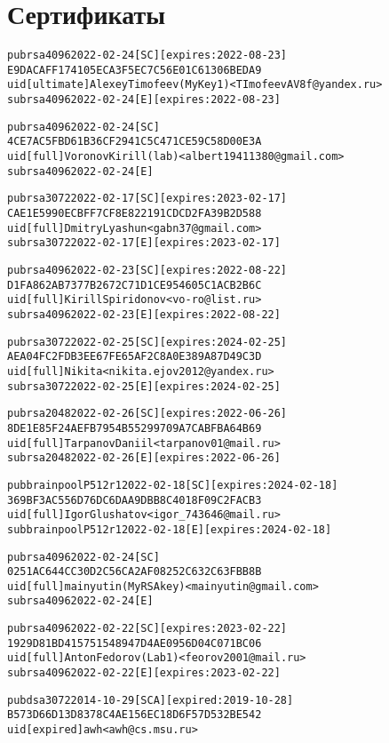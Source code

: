 \section{Сертификаты}
\begin{alltt}

pub   rsa4096 2022-02-24 [SC] [expires: 2022-08-23]
      E9DACAFF174105ECA3F5EC7C56E01C61306BEDA9
uid           [ultimate] Alexey Timofeev (My Key1) <TImofeevAV8f@yandex.ru>
sub   rsa4096 2022-02-24 [E] [expires: 2022-08-23]

pub   rsa4096 2022-02-24 [SC]
      4CE7AC5FBD61B36CF2941C5C471CE59C58D00E3A
uid           [  full  ] Voronov Kirill (lab) <albert19411380@gmail.com>
sub   rsa4096 2022-02-24 [E]

pub   rsa3072 2022-02-17 [SC] [expires: 2023-02-17]
      CAE1E5990ECBFF7CF8E822191CDCD2FA39B2D588
uid           [  full  ] Dmitry Lyashun <gabn37@gmail.com>
sub   rsa3072 2022-02-17 [E] [expires: 2023-02-17]

pub   rsa4096 2022-02-23 [SC] [expires: 2022-08-22]
      D1FA862AB7377B2672C71D1CE954605C1ACB2B6C
uid           [  full  ] Kirill Spiridonov <vo-ro@list.ru>
sub   rsa4096 2022-02-23 [E] [expires: 2022-08-22]

pub   rsa3072 2022-02-25 [SC] [expires: 2024-02-25]
      AEA04FC2FDB3EE67FE65AF2C8A0E389A87D49C3D
uid           [  full  ] Nikita <nikita.ejov2012@yandex.ru>
sub   rsa3072 2022-02-25 [E] [expires: 2024-02-25]

pub   rsa2048 2022-02-26 [SC] [expires: 2022-06-26]
      8DE1E85F24AEFB7954B55299709A7CABFBA64B69
uid           [  full  ] Tarpanov Daniil <tarpanov01@mail.ru>
sub   rsa2048 2022-02-26 [E] [expires: 2022-06-26]

pub   brainpoolP512r1 2022-02-18 [SC] [expires: 2024-02-18]
      369BF3AC556D76DC6DAA9DBB8C4018F09C2FACB3
uid           [  full  ] Igor Glushatov <igor_743646@mail.ru>
sub   brainpoolP512r1 2022-02-18 [E] [expires: 2024-02-18]

pub   rsa4096 2022-02-24 [SC]
      0251AC644CC30D2C56CA2AF08252C632C63FBB8B
uid           [  full  ] mainyutin (My RSA key) <mainyutin@gmail.com>
sub   rsa4096 2022-02-24 [E]

pub   rsa4096 2022-02-22 [SC] [expires: 2023-02-22]
      1929D81BD415751548947D4AE0956D04C071BC06
uid           [  full  ] Anton Fedorov (Lab1) <feorov2001@mail.ru>
sub   rsa4096 2022-02-22 [E] [expires: 2023-02-22]

pub   dsa3072 2014-10-29 [SCA] [expired: 2019-10-28]
      B573D66D13D8378C4AE156EC18D6F57D532BE542
uid           [ expired] awh <awh@cs.msu.ru>


\end{alltt}
